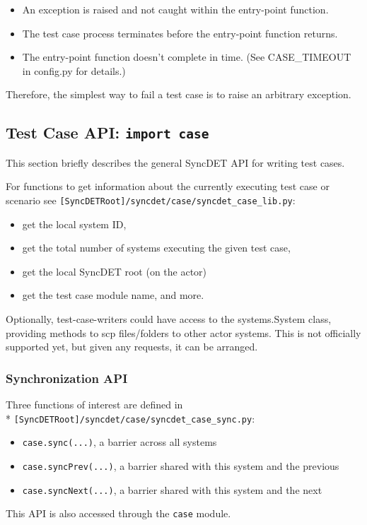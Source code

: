 \begin{itemize}
\item An exception is raised and not caught within the entry-point function.
\item The test case process terminates before the entry-point function returns.
\item The entry-point function doesn't complete in time. (See CASE\_TIMEOUT
in config.py for details.)
\end{itemize}

Therefore, the simplest way to fail a test case is to raise an arbitrary
exception.

\subsection{Test Case API: {\tt import case}} 

This section briefly describes the general SyncDET API for writing test cases.
 
For functions to get information about the currently executing test case or
scenario see {\tt [SyncDETRoot]/syncdet/case/syncdet\_case\_lib.py}:
\begin{itemize}
\item get the local system ID, 
\item get the total number of systems executing the given test case, 
\item get the local SyncDET root (on the actor)
\item get the test case module name, and more.
\end{itemize}

Optionally, test-case-writers could have access to the systems.System class,
providing methods to scp files/folders to other actor systems. This is not
officially supported yet, but given any requests, it can be arranged.

\subsubsection{Synchronization API}

Three functions of interest are defined in \\*
{\tt [SyncDETRoot]/syncdet/case/syncdet\_case\_sync.py}:
\begin{itemize}
\item {\tt case.sync(...)}, a barrier across all systems
\item {\tt case.syncPrev(...)}, a barrier shared with this system and the previous
\item {\tt case.syncNext(...)}, a barrier shared with this system and the next
\end{itemize}
This API is also accessed through the {\tt case} module.


